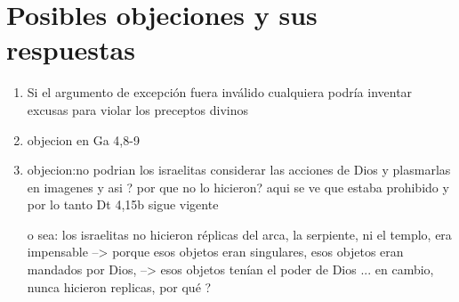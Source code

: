 \documentclass{article}
\begin{document}






\section{Posibles objeciones y sus respuestas}

\begin{enumerate}
\item Si el argumento de excepci\'on fuera inv\'alido cualquiera podr\'{i}a inventar excusas para violar los preceptos divinos
\item objecion en Ga 4,8-9
\item objecion:no podrian los israelitas considerar las acciones de Dios y plasmarlas en imagenes y asi ? por que no lo hicieron? aqui se ve que estaba prohibido y por lo tanto Dt 4,15b sigue vigente

    o sea: los israelitas no hicieron r\'eplicas del arca, la serpiente, ni el templo, era impensable --> porque esos objetos eran singulares, esos objetos eran mandados por Dios, --> esos objetos ten\'{i}an el poder de Dios ... en cambio, nunca hicieron replicas, por qu\'e ?

\end{enumerate}



\end{document}
